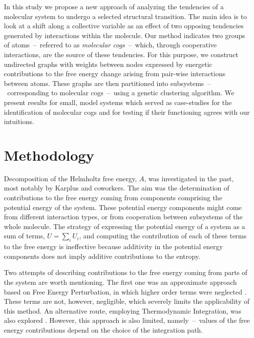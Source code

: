 \documentclass[a4paper,11pt,twoside]{book}%
\begin{document}
In this study we propose a new approach of analyzing the tendencies of a {\color{black}molecular} system to undergo a selected structural transition.
The main idea is to look at a shift along a collective variable as an effect of two opposing tendencies generated by interactions within the molecule.
Our method {\color{black}indicates} two groups of atoms~--~referred to as \emph{molecular cogs}~--~which, through cooperative interactions, are the source of these tendencies.
For this purpose, we construct undirected graphs with weights between nodes expressed by energetic contributions to the free energy change arising from pair-wise interactions between atoms.
{\color{black}
These graphs are then partitioned into subsystems~--~corresponding to molecular cogs~--~using a genetic clustering algorithm.
We present results for small, model systems which served as case-studies for the identification of molecular cogs and for testing if their functioning agrees with our intuitions.
}


\section{Methodology}


Decomposition of the Helmholtz free energy, $A$, was investigated in the past, most notably by Karplus and coworkers\cite{boresch1995meaning,brady1995decomposition}.
{\color{black}The aim was the determination of contributions to the free energy coming from components comprising the potential energy of the system.
These potential energy components might come from different interaction types, or from cooperation between subsystems of the whole molecule.}
The strategy of expressing the potential energy of a system as a sum of terms, $U=\sum_i U_i$, and {\color{black}computing} the contribution of each of these terms to the free energy is ineffective because additivity in the potential energy components does not imply additive contributions to the entropy\cite{dill1997additivity}.

Two attempts {\color{black}of describing contributions to the free energy coming from parts of the system} are worth mentioning.
The first one was an approximate approach based on Free Energy Perturbation, in which higher order terms were neglected \cite{brady1995decomposition}.
These terms are not, however, negligible, which severely limits the applicability of this method.
An alternative route, employing Thermodynamic Integration, was also explored \cite{boresch1995meaning}. 
However, this approach is also limited, namely~--~values of the free energy contributions depend on the choice of the integration path.
\end{document}
